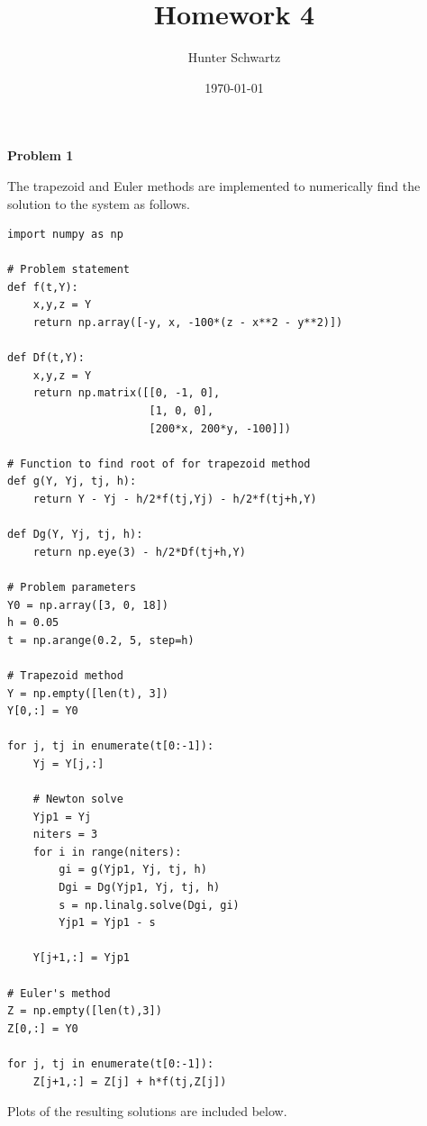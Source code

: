 \documentclass[12pt]{article}
\begin{document}
\title{Homework 4}
\date{\today}
\author{Hunter Schwartz}
\maketitle


\textbf{Problem 1}

The trapezoid and Euler methods are implemented to numerically find the solution to the system as follows.

\begin{verbatim}
import numpy as np

# Problem statement
def f(t,Y):
    x,y,z = Y
    return np.array([-y, x, -100*(z - x**2 - y**2)])
    
def Df(t,Y):
    x,y,z = Y
    return np.matrix([[0, -1, 0],
                      [1, 0, 0],
                      [200*x, 200*y, -100]])

# Function to find root of for trapezoid method
def g(Y, Yj, tj, h):
    return Y - Yj - h/2*f(tj,Yj) - h/2*f(tj+h,Y)

def Dg(Y, Yj, tj, h):
    return np.eye(3) - h/2*Df(tj+h,Y)
        
# Problem parameters
Y0 = np.array([3, 0, 18])
h = 0.05
t = np.arange(0.2, 5, step=h)

# Trapezoid method
Y = np.empty([len(t), 3])
Y[0,:] = Y0

for j, tj in enumerate(t[0:-1]):
    Yj = Y[j,:]

    # Newton solve
    Yjp1 = Yj
    niters = 3
    for i in range(niters):
        gi = g(Yjp1, Yj, tj, h)
        Dgi = Dg(Yjp1, Yj, tj, h)
        s = np.linalg.solve(Dgi, gi)
        Yjp1 = Yjp1 - s
        
    Y[j+1,:] = Yjp1
    
# Euler's method
Z = np.empty([len(t),3])
Z[0,:] = Y0

for j, tj in enumerate(t[0:-1]):
    Z[j+1,:] = Z[j] + h*f(tj,Z[j])
\end{verbatim}

Plots of the resulting solutions are included below.
\end{document}
